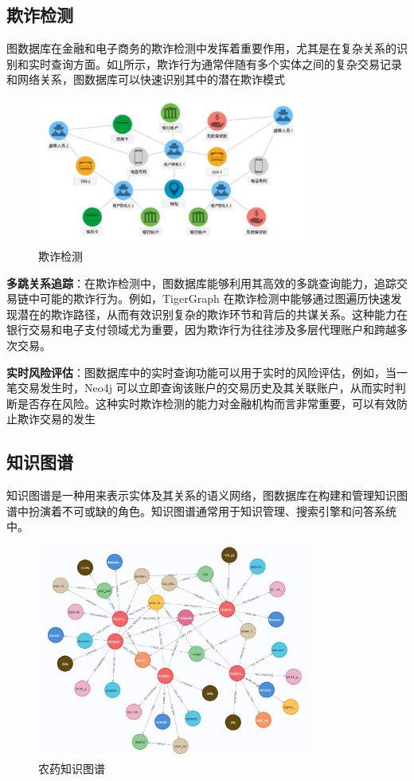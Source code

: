 \subsection{欺诈检测}
图数据库在金融和电子商务的欺诈检测中发挥着重要作用，尤其是在复杂关系的识别和实时查询方面。如\cref{fig:21}所示，欺诈行为通常伴随有多个实体之间的复杂交易记录和网络关系，图数据库可以快速识别其中的潜在欺诈模式
\begin{figure}[H]
	\centering
	\includegraphics[width=0.8\textwidth]{images/21.png}
	\caption{欺诈检测}
	\label{fig:21}
\end{figure}

\textbf{多跳关系追踪}：在欺诈检测中，图数据库能够利用其高效的多跳查询能力，追踪交易链中可能的欺诈行为。例如，TigerGraph 在欺诈检测中能够通过图遍历快速发现潜在的欺诈路径，从而有效识别复杂的欺诈环节和背后的共谋关系。这种能力在银行交易和电子支付领域尤为重要，因为欺诈行为往往涉及多层代理账户和跨越多次交易\cite{mao2022financial,cheng2020graph,li2022internet}。

\textbf{实时风险评估}：图数据库中的实时查询功能可以用于实时的风险评估，例如，当一笔交易发生时，Neo4j 可以立即查询该账户的交易历史及其关联账户，从而实时判断是否存在风险。这种实时欺诈检测的能力对金融机构而言非常重要，可以有效防止欺诈交易的发生


\subsection{知识图谱}
知识图谱是一种用来表示实体及其关系的语义网络，图数据库在构建和管理知识图谱中扮演着不可或缺的角色。知识图谱通常用于知识管理、搜索引擎和问答系统中\cite{黄恒琪2019知识图谱研究综述}。
\begin{figure}[H]
    \centering
    \includegraphics[width=0.8\textwidth]{images/23.png}
    \caption{农药知识图谱}
    \label{fig:23}
\end{figure}

